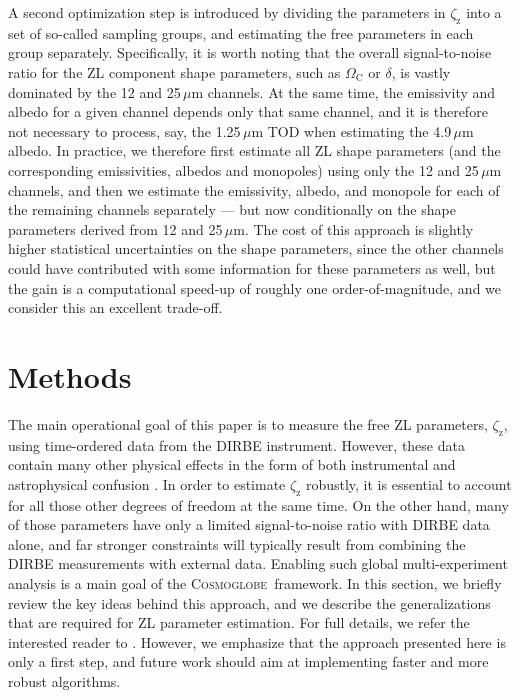 \documentclass[twocolumn]{aa}
\newcommand{\cosmoglobe}{\textsc{Cosmoglobe}}
\begin{document}
A second optimization step is introduced by dividing the parameters in
$\zeta_{\mathrm{z}}$ into a set of so-called sampling groups, and
estimating the free parameters in each group separately. Specifically,
it is worth noting that the overall signal-to-noise ratio for the ZL
component shape parameters, such as $\Omega_{\mathrm{C}}$ or $\delta$,
is vastly dominated by the 12 and 25\,$\mu$m channels. At the same
time, the emissivity and albedo for a given channel depends only that
same channel, and it is therefore not necessary to process, say, the
1.25\,$\mu$m TOD when estimating the 4.9\,$\mu$m albedo. In practice,
we therefore first estimate all ZL shape parameters (and the
corresponding emissivities, albedos and monopoles) using only the 12
and 25\,$\mu$m channels, and then we estimate the emissivity, albedo,
and monopole for each of the remaining channels separately --- but now
conditionally on the shape parameters derived from 12 and
25\,$\mu$m. The cost of this approach is slightly higher statistical
uncertainties on the shape parameters, since the other channels could
have contributed with some information for these parameters as well,
but the gain is a computational speed-up of roughly one
order-of-magnitude, and we consider this an excellent trade-off.


\section{Methods}\label{sect:param-estimation}

The main operational goal of this paper is to measure the free ZL
parameters, $\zeta_{\mathrm{z}}$, using time-ordered data from the
DIRBE instrument. However, these data contain many other physical
effects in the form of both instrumental and astrophysical confusion
\citep[e.g.,][]{hauser1998,arendt1998}. In order to estimate
$\zeta_{\mathrm{z}}$ robustly, it is essential to account for all
those other degrees of freedom at the same time. On the other hand,
many of those parameters have only a limited signal-to-noise ratio
with DIRBE data alone, and far stronger constraints will typically
result from combining the DIRBE measurements with external
data. Enabling such global multi-experiment analysis is a main goal of
the \cosmoglobe\ framework. In this section, we briefly review the key
ideas behind this approach, and we describe the generalizations that
are required for ZL parameter estimation. For full details, we refer
the interested reader to \citet{Watts2023,CG02_01}. However, we
emphasize that the approach presented here is only a first step, and
future work should aim at implementing faster and more robust
algorithms.
\end{document}
